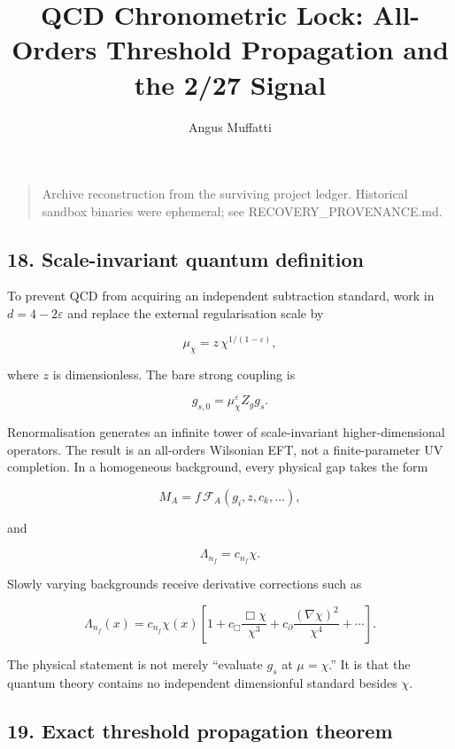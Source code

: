 \documentclass[
]{article}
\title{QCD Chronometric Lock: All-Orders Threshold Propagation and the
2/27 Signal}
\author{Angus Muffatti}
\date{}
\begin{document}
\maketitle

\begin{quote}
Archive reconstruction from the surviving project ledger. Historical
sandbox binaries were ephemeral; see RECOVERY\_PROVENANCE.md.
\end{quote}

\hypertarget{scale-invariant-quantum-definition}{%
\subsection{18. Scale-invariant quantum
definition}\label{scale-invariant-quantum-definition}}

To prevent QCD from acquiring an independent subtraction standard, work
in \(d=4-2\varepsilon\) and replace the external regularisation scale by

\[
\mu_\chi=z\,\chi^{1/(1-\varepsilon)},
\]

where \(z\) is dimensionless. The bare strong coupling is

\[
g_{s,0}=\mu_\chi^\varepsilon Z_g g_s.
\]

Renormalisation generates an infinite tower of scale-invariant
higher-dimensional operators. The result is an all-orders Wilsonian EFT,
not a finite-parameter UV completion. In a homogeneous background, every
physical gap takes the form

\[
M_A=f\,\mathcal F_A(g_i,z,c_k,\ldots),
\]

and

\[
\Lambda_{n_f}=c_{n_f}\chi.
\]

Slowly varying backgrounds receive derivative corrections such as

\[
\Lambda_{n_f}(x)=c_{n_f}\chi(x)
\left[1+c_\Box\frac{\Box\chi}{\chi^3}
+c_\partial\frac{(\nabla\chi)^2}{\chi^4}+\cdots\right].
\]

The physical statement is not merely ``evaluate \(g_s\) at
\(\mu=\chi\).'' It is that the quantum theory contains no independent
dimensionful standard besides \(\chi\).

\hypertarget{exact-threshold-propagation-theorem}{%
\subsection{19. Exact threshold propagation
theorem}\label{exact-threshold-propagation-theorem}}
\end{document}
